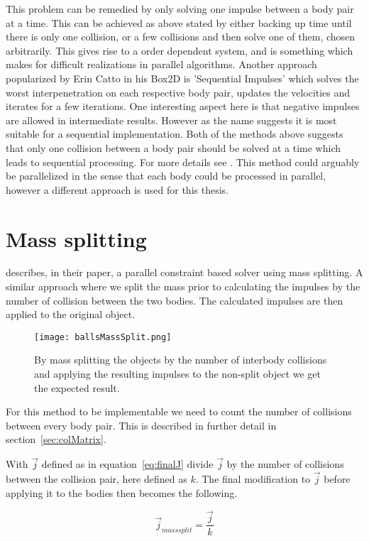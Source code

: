 This problem can be remedied by only solving one impulse between a body pair at a time.
This can be achieved as above stated by either backing up time until there
is only one collision, or a few collisions and then solve one of them, chosen
arbitrarily. This gives rise to a order dependent system, and is something which
makes for difficult realizations in parallel algorithms. Another approach popularized
by Erin Catto in his Box2D is 'Sequential Impulses' which solves the worst interpenetration
on each respective body pair, updates the velocities and iterates for a few iterations.
One interesting aspect here is that negative impulses are allowed in intermediate
results. However as the name suggests it is most suitable for a sequential implementation.
Both of the methods above suggests that only one collision between a body pair should
be solved at a time which leads to sequential processing. For more details see \cite{catto}.
This method could arguably be parallelized in the sense that each body could be
processed in parallel, however a different approach is used for this thesis.

\section{Mass splitting}\label{sec:massSplit}
\cite{tonge} describes, in their paper, a parallel constraint based solver
using mass splitting. A similar approach where we split the mass prior to
calculating the impulses by the number of collision between the two bodies. The
calculated impulses are then applied to the original object.

\begin{figure}[H]
  \centering
  \texttt{[image: ballsMassSplit.png]}
  \caption{By mass splitting the objects by the number of interbody collisions
  and applying the resulting impulses to the non-split object we get the expected result.}
  \label{fig:massSplit}
\end{figure}

For this method to be implementable we need to count the number of collisions between
every body pair. This is described in further detail in section~\ref{sec:colMatrix}.

With $\vec{j}$ defined as in equation~\ref{eq:finalJ} divide $\vec{j}$ by
the number of collisions between the collision pair, here defined as $k$. The final modification to
$\vec{j}$ before applying it to the bodies then becomes the following.

\begin{equation}
  \vec{j}_{mass split} = \frac{\vec{j}}{k}
\end{equation}

